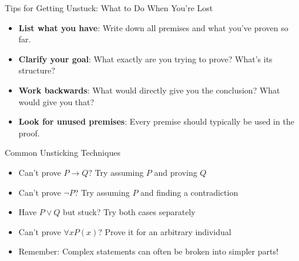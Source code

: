 \documentclass{beamer}
\begin{document}
	\begin{frame}{Tips for Getting Unstuck: What to Do When You're Lost}
		\begin{itemize}
			\item \textbf{List what you have}: Write down all premises and what you've proven so far.
			\item \textbf{Clarify your goal}: What exactly are you trying to prove? What's its structure?
			\item \textbf{Work backwards}: What would directly give you the conclusion? What would give you that?
			\item \textbf{Look for unused premises}: Every premise should typically be used in the proof.
		\end{itemize}
		
		\begin{alertblock}{Common Unsticking Techniques}
			\begin{itemize}
				\item Can't prove $P \rightarrow Q$? Try assuming $P$ and proving $Q$
				\item Can't prove $\neg P$? Try assuming $P$ and finding a contradiction
				\item Have $P \lor Q$ but stuck? Try both cases separately
				\item Can't prove $\forall x P(x)$? Prove it for an arbitrary individual
				\item Remember: Complex statements can often be broken into simpler parts!
			\end{itemize}
		\end{alertblock}
	\end{frame}
	
\end{document}
